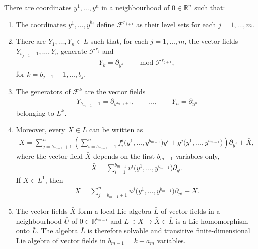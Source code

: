 \begin{Proposition}\label{p1}
There are coordinates $y^1,\dots,y^n$ in a neighbourhood of $0\in{\mathbb R}^n$ such that:
\begin{enumerate}\itemsep=0pt
\item[$1.$] The coordinates $y^1,\dots, y^{b_j}$ define ${\mathcal F}^{r_{j+1}}$ as their level sets for each $j=1,\dots,m$.
\item[$2.$] There are $Y_1,\dots,Y_n\in L$ such that, for each $j=1,\dots,m$, the vector fields $Y_{b_{j-1}+1},\dots,Y_n$ generate ${\mathcal F}^{r_j}$ and
\begin{gather}\label{gen} Y_k=\partial_{y^k} \qquad \operatorname{mod}{\mathcal F}^{r_{j+1}} ,\end{gather}
for $k=b_{j-1}+1,\dots,b_j$.
\item[$3.$] The generators of ${\mathcal F}^k$ are the vector fields
\begin{gather}\label{fine} Y_{b_{m-1}+1}=\partial_{y^{b_{m-1}+1}} ,\qquad \dots,\qquad Y_n=\partial_{y^n}\end{gather}
belonging to $L^k$.
\item[$4.$] Moreover, every $X\in L$ can be written as
\begin{gather}\label{form}X=\sum_{j=b_{m-1}+1}^n\left(\sum_{i=b_{m-1}+1}^n f_i^j\big(y^1,\dots,y^{b_{m-1}}\big)y^i+g^j\big(y^1,\dots,y^{b_{m-1}}\big)\right)\partial_{y^j}
+\bar{X} ,
\end{gather}
where the vector field $\bar{X}$ depends on the first $b_{m-1}$ variables only,
\begin{gather*}%
\bar{X}=\sum_{i=1}^{b_{m-1}}v^i\big(y^1,\dots,y^{b_{m-1}}\big)\partial_{y^i} .\end{gather*}
If $X\in L^1$, then
\begin{gather*}%
X=\sum_{j=b_{m-1}+1}^nu^j\big(y^1,\dots,y^{b_{m-1}}\big)\partial_{y^j}
+\bar{X} .
\end{gather*}

\item[$5.$] The vector fields $\bar{X}$ form a local Lie algebra $\bar{L}$ of vector fields in a neighbourhood $\bar{U}$
of $0\in{\mathbb R}^{b_{m-1}}$ and $L\ni X\mapsto \bar{X}\in\overline{L}$ is a Lie homomorphism onto $\bar{L}$. The algebra $\bar{L}$ is therefore solvable and transitive finite-dimensional Lie algebra of vector fields in $b_{m-1}=k-a_m$ variables.
\end{enumerate}
\end{Proposition}
